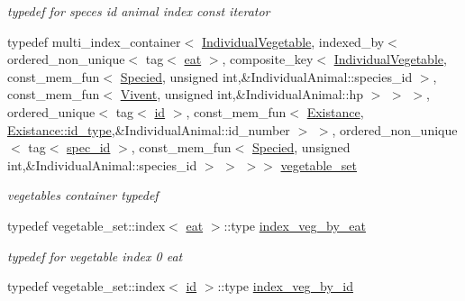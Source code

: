 \begin{DoxyCompactItemize}
\begin{DoxyCompactList}\small\item\em typedef for speces id animal index const iterator \end{DoxyCompactList}\item 
typedef multi\_\-index\_\-container$<$ \hyperlink{classIndividualVegetable}{IndividualVegetable}, indexed\_\-by$<$ ordered\_\-non\_\-unique$<$ tag$<$ \hyperlink{structSubsystemContainer_1_1eat}{eat} $>$, composite\_\-key$<$ \hyperlink{classIndividualVegetable}{IndividualVegetable}, const\_\-mem\_\-fun$<$ \hyperlink{classSpecied}{Specied}, unsigned int,\&IndividualAnimal::species\_\-id $>$, const\_\-mem\_\-fun$<$ \hyperlink{classVivent}{Vivent}, unsigned int,\&IndividualAnimal::hp $>$ $>$ $>$, ordered\_\-unique$<$ tag$<$ \hyperlink{structSubsystemContainer_1_1id}{id} $>$, const\_\-mem\_\-fun$<$ \hyperlink{classExistance}{Existance}, \hyperlink{classExistance_a82c4092964457cd7da30d53072c62f1a}{Existance::id\_\-type},\&IndividualAnimal::id\_\-number $>$ $>$, ordered\_\-non\_\-unique$<$ tag$<$ \hyperlink{structSubsystemContainer_1_1spec__id}{spec\_\-id} $>$, const\_\-mem\_\-fun$<$ \hyperlink{classSpecied}{Specied}, unsigned int,\&IndividualAnimal::species\_\-id $>$ $>$ $>$$>$ \hyperlink{classSubsystemContainer_aa11de189765005941e3c055feceb3db0}{vegetable\_\-set}
\begin{DoxyCompactList}\small\item\em vegetables container typedef \end{DoxyCompactList}\item 
\hypertarget{classSubsystemContainer_a03a3aebd29f38555702dfe6414ca4042}{
typedef vegetable\_\-set::index$<$ \hyperlink{structSubsystemContainer_1_1eat}{eat} $>$::type \hyperlink{classSubsystemContainer_a03a3aebd29f38555702dfe6414ca4042}{index\_\-veg\_\-by\_\-eat}}
\label{classSubsystemContainer_a03a3aebd29f38555702dfe6414ca4042}

\begin{DoxyCompactList}\small\item\em typedef for vegetable index 0 eat \end{DoxyCompactList}\item 
\hypertarget{classSubsystemContainer_a9434fd23ddbbf223a7d839a4709f5eaf}{
typedef vegetable\_\-set::index$<$ \hyperlink{structSubsystemContainer_1_1id}{id} $>$::type \hyperlink{classSubsystemContainer_a9434fd23ddbbf223a7d839a4709f5eaf}{index\_\-veg\_\-by\_\-id}}
\label{classSubsystemContainer_a9434fd23ddbbf223a7d839a4709f5eaf}


\end{DoxyCompactItemize}
